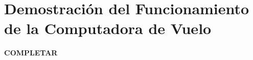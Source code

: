 \section*{Demostración del Funcionamiento de la Computadora de Vuelo}

\textbf{{\color{red} COMPLETAR}}